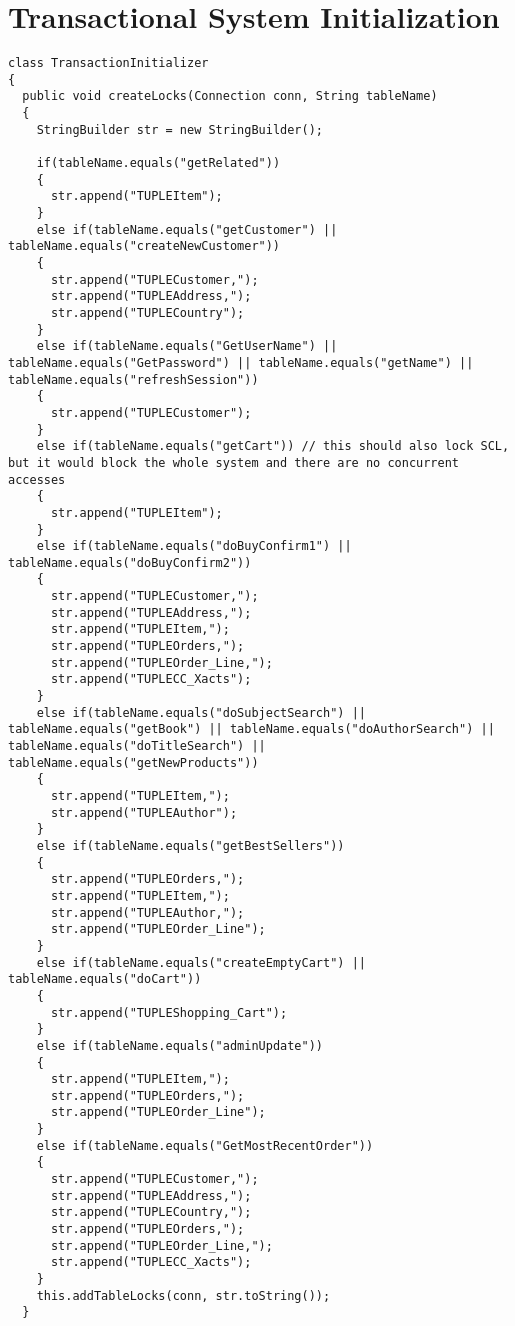 \section{Transactional System Initialization}

\lstset{
  language=Java, 
  caption=Client Side, 
  label=lst:client_trans,
}


\begin{shaded}
\begin{lstlisting}
class TransactionInitializer
{
  public void createLocks(Connection conn, String tableName)
  {
    StringBuilder str = new StringBuilder();
	
	if(tableName.equals("getRelated"))
	{
	  str.append("TUPLEItem");
	}
	else if(tableName.equals("getCustomer") || tableName.equals("createNewCustomer"))
	{
	  str.append("TUPLECustomer,");
	  str.append("TUPLEAddress,");
	  str.append("TUPLECountry");
	}
	else if(tableName.equals("GetUserName") || tableName.equals("GetPassword") || tableName.equals("getName") || tableName.equals("refreshSession"))
	{
	  str.append("TUPLECustomer");
	}
	else if(tableName.equals("getCart")) // this should also lock SCL, but it would block the whole system and there are no concurrent accesses
	{
	  str.append("TUPLEItem");
	}
	else if(tableName.equals("doBuyConfirm1") || tableName.equals("doBuyConfirm2"))
	{
	  str.append("TUPLECustomer,");
	  str.append("TUPLEAddress,");
	  str.append("TUPLEItem,");
	  str.append("TUPLEOrders,");
	  str.append("TUPLEOrder_Line,");
	  str.append("TUPLECC_Xacts");
	}
	else if(tableName.equals("doSubjectSearch") || tableName.equals("getBook") || tableName.equals("doAuthorSearch") || tableName.equals("doTitleSearch") || tableName.equals("getNewProducts"))
	{
	  str.append("TUPLEItem,");
	  str.append("TUPLEAuthor");
	}
	else if(tableName.equals("getBestSellers"))
	{
	  str.append("TUPLEOrders,");
	  str.append("TUPLEItem,");
	  str.append("TUPLEAuthor,");
	  str.append("TUPLEOrder_Line");
	}
	else if(tableName.equals("createEmptyCart") || tableName.equals("doCart"))
	{
	  str.append("TUPLEShopping_Cart");
	}
	else if(tableName.equals("adminUpdate"))
	{
	  str.append("TUPLEItem,");
	  str.append("TUPLEOrders,");
	  str.append("TUPLEOrder_Line");
	}
	else if(tableName.equals("GetMostRecentOrder"))
	{
	  str.append("TUPLECustomer,");
	  str.append("TUPLEAddress,");
	  str.append("TUPLECountry,");
	  str.append("TUPLEOrders,");
	  str.append("TUPLEOrder_Line,");
	  str.append("TUPLECC_Xacts");
	}	
	this.addTableLocks(conn, str.toString());
  }
	

\end{lstlisting}
\end{shaded}
